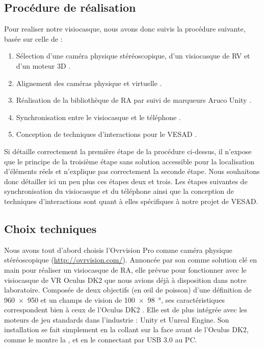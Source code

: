 \subsection{Procédure de réalisation}
\label{subsec:prototype_procedure}
Pour realiser notre visiocasque, nous avons donc suivis la procédure suivante, basée sur celle de \cite{Steptoe2013} :
\begin{enumerate}
  \item Sélection d'une caméra physique stéréoscopique, d'un visiocasque de RV et d'un moteur 3D .
  \item Alignement des caméras physique et virtuelle .
  \item Réalisation de la bibliothèque de RA par suivi de marqueurs Aruco Unity .
  \item Synchronisation entre le visiocasque et le téléphone .
  \item Conception de techniques d'interactions pour le VESAD .
\end{enumerate}

Si \citeauthor{Steptoe2013} détaille correctement la première étape de la procédure ci-dessus, il n'expose que le principe de la troisième étape sans solution accessible pour la localisation d'éléments réels et n'explique pas correctement la seconde étape. Nous souhaitons donc détailler ici un peu plus ces étapes deux et trois. Les étapes suivantes de synchronisation du visiocasque et du téléphone ainsi que la conception de techniques d'interactions sont quant à elles spécifiques à notre projet de VESAD.

\subsection{Choix techniques}
\label{subsec:technical_choices}
Nous avons tout d'abord choisis l'Ovrvision Pro comme caméra physique stéréoscopique (\url{http://ovrvision.com/}). Annoncée par son comme solution clé en main pour réaliser un visiocasque de RA, elle prévue pour fonctionner avec le visiocasque de VR Oculus DK2 que nous avions déjà à disposition dans notre laboratoire. Composée de deux objectifs  (en \oe il de poisson) d'une définition de \SI{960x950}{\px} et un champs de vision de \SI{100x98}{\degree}, ses caractéristiques correspondent bien à ceux de l'Oculus DK2 . Elle est de plus intégrée avec les moteurs de jeu standards dans l'industrie : Unity et Unreal Engine. Son installation se fait simplement en la collant sur la face avant de l'Oculus DK2, comme le montre la , et en le connectant par USB 3.0 au PC.


